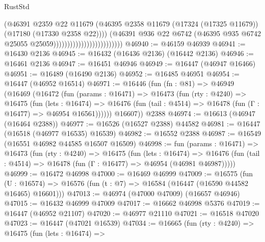 \begin{lexlean}{RustStd}
\begin{coremodule}
{\begin{coremodule}
{{{{{{{{{{{{{{{{{{{{{{{{{{{{{{{{{{{{{{{{{{{{{{{{{{{{{{{                                                  (@46391
                                                    @2359
                                                    @22
                                                    @11679
                                                    (@46395
                                                      @2358
                                                      @11679
                                                      (@17324 (@17325 @11679))
                                                      (@17180 (@17330 @2358 @22))))
                                                  (@46391
                                                    @936
                                                    @22
                                                    @6742
                                                    (@46395
                                                      @935
                                                      @6742
                                                      @25055
                                                      @25059)))))))))))))))))))))))))
@46940 := @46159 @46939
@46941 := @16430 @2136
@46945 := @16432 (@16436 @2136) (@16442 @2136)
@46946 := @16461 @2136
@46947 := @16451 @46946
@46949 := @16447 (@46947 @16466)
@46951 := @16489 (@16490 @2136)
@46952 := @16485 @46951
@46954 := @16447 (@46952 @16514)
@46971 := @16446
    (fun (fn : @81) =>
    @46949
      (@16469
        (@16472
          (fun (params : @16471) =>
          @16473
            (fun (rty : @4240) =>
            @16475
              (fun (lets : @16474) =>
              @16476 (fun (tail : @4514) => @16478 (fun (Γ : @16477) => @46954 @16561))))))
        @16607))
    @2388
@46974 := @16613 (@46947 (@16464 @2388))
@46977 := @16526 (@16527 @2388) @44582
@46981 := @16447 (@16518 (@46977 @16535) @16539)
@46982 := @16552 @2388
@46987 := @16549 (@16551 @46982 @44585 @16507 @16509)
@46998 := fun (params : @16471) =>
  @16473
    (fun (rty : @4240) =>
    @16475
      (fun (lets : @16474) =>
      @16476 (fun (tail : @4514) => @16478 (fun (Γ : @16477) => @46954 (@46981 @46987)))))
@46999 := @16472 @46998
@47000 := @16469 @46999
@47009 := @16575
    (fun (U : @16574) => @16576 (fun (t : @7) => @16584 (@16447 (@16590 @44582 @16465) @16601)))
@47013 := @46974 (@47000 @47009) (@16657 @46946)
@47015 := @16432 @46999 @47009
@47017 := @16662 @46998 @5376
@47019 := @16447 (@46952 @21107)
@47020 := @46977 @21110
@47021 := @16518 @47020
@47023 := @16447 (@47021 @16539)
@47034 := @16665
    (fun (rty : @4240) =>
    @16475
      (fun (lets : @16474) =>
}}}}}}}}}}}}}}}}}}}}}}}}}}}}}}}}}}}}}}}}}}}}}}}}}}}}}}}
\end{coremodule}}
\end{coremodule}
\end{lexlean}

